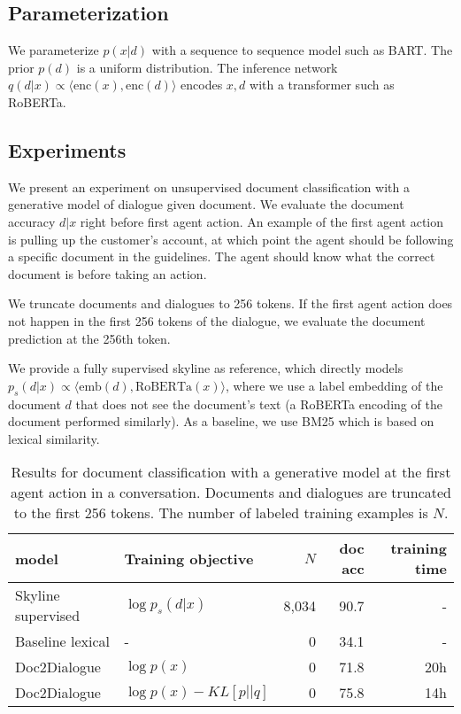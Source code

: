 \documentclass[11pt]{article}
\begin{document}
\subsection{Parameterization}
We parameterize $p(x|d)$ with a sequence to sequence model such as BART.
The prior $p(d)$ is a uniform distribution.
The inference network $q(d|x) \propto \langle\text{enc}(x),\text{enc}(d)\rangle$
encodes $x,d$ with a transformer such as RoBERTa.


\subsection{Experiments}
We present an experiment on
unsupervised document classification with a generative model of dialogue given document.
We evaluate the document accuracy $d|x$ right before first agent action.
An example of the first agent action is pulling up the customer's account,
at which point the agent should be following a specific document in the guidelines.
The agent should know what the correct document is before taking an action.

We truncate documents and dialogues to 256 tokens.
If the first agent action does not happen in the first 256 tokens of the dialogue,
we evaluate the document prediction at the 256th token.

We provide a fully supervised skyline as reference, which directly models
$p_s(d|x) \propto \langle \text{emb}(d), \text{RoBERTa}(x)\rangle$,
where we use a label embedding of the document $d$ that does not see
the document's text (a RoBERTa encoding of the document performed similarly).
As a baseline, we use BM25 which is based on lexical similarity.

\begin{table*}
\centering
\begin{tabular}{llrrr}
\toprule
model                             & Training objective     & $N$   & doc acc & training time\\
\midrule
Skyline supervised                & $\log p_s(d|x)$        & 8,034 &    90.7 & -\\
Baseline lexical                  & -                      & 0     &    34.1 & -\\
Doc2Dialogue                      & $\log p(x)$            & 0     &    71.8 & 20h\\
Doc2Dialogue                      & $\log p(x) - KL[p||q]$ & 0     &    75.8 & 14h\\
\bottomrule
\end{tabular}
\caption{
\label{tbl:unsup-doc}
Results for document classification with a generative model at the first
agent action in a conversation. Documents and dialogues are truncated to the first 256
tokens.
The number of labeled training examples is $N$.}
\end{table*}
\end{document}
